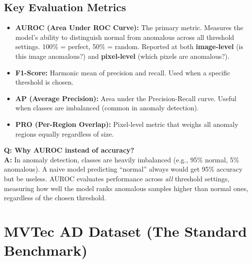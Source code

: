 \documentclass[12pt, a4paper]{article}
\begin{document}
\subsection{Key Evaluation Metrics}

\begin{itemize}[leftmargin=*]
    \item \textbf{AUROC (Area Under ROC Curve):} The primary metric. Measures the model's ability to distinguish normal from anomalous across all threshold settings. 100\% = perfect, 50\% = random. Reported at both \textbf{image-level} (is this image anomalous?) and \textbf{pixel-level} (which pixels are anomalous?).
    \item \textbf{F1-Score:} Harmonic mean of precision and recall. Used when a specific threshold is chosen.
    \item \textbf{AP (Average Precision):} Area under the Precision-Recall curve. Useful when classes are imbalanced (common in anomaly detection).
    \item \textbf{PRO (Per-Region Overlap):} Pixel-level metric that weighs all anomaly regions equally regardless of size.
\end{itemize}

\begin{vivaqa}
\textbf{Q: Why AUROC instead of accuracy?}\\[4pt]
\textbf{A:} In anomaly detection, classes are heavily imbalanced (e.g., 95\% normal, 5\% anomalous). A naive model predicting ``normal'' always would get 95\% accuracy but be useless. AUROC evaluates performance across \textit{all} threshold settings, measuring how well the model ranks anomalous samples higher than normal ones, regardless of the chosen threshold.
\end{vivaqa}



\section{MVTec AD Dataset (The Standard Benchmark)}
\end{document}
